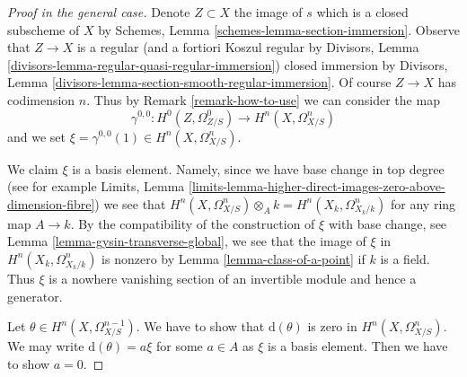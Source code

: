 \begin{proof}[Proof in the general case]
\medskip\noindent
Denote $Z \subset X$ the image of $s$ which is a closed subscheme of $X$ by
Schemes, Lemma \ref{schemes-lemma-section-immersion}.
Observe that $Z \to X$ is a regular (and a fortiori Koszul regular by
Divisors, Lemma \ref{divisors-lemma-regular-quasi-regular-immersion})
closed immersion by
Divisors, Lemma \ref{divisors-lemma-section-smooth-regular-immersion}.
Of course $Z \to X$ has codimension $n$. Thus by
Remark \ref{remark-how-to-use}
we can consider the map
$$
\gamma^{0, 0} : H^0(Z, \Omega^0_{Z/S}) \longrightarrow H^n(X, \Omega^n_{X/S})
$$
and we set $\xi = \gamma^{0, 0}(1) \in H^n(X, \Omega^n_{X/S})$.

\medskip\noindent
We claim $\xi$ is a basis element. Namely, since we have base change in
top degree (see for example Limits, Lemma
\ref{limits-lemma-higher-direct-images-zero-above-dimension-fibre})
we see that
$H^n(X, \Omega^n_{X/S}) \otimes_A k = H^n(X_k, \Omega^n_{X_k/k})$
for any ring map $A \to k$. By the compatibility of
the construction of $\xi$ with base change,
see Lemma \ref{lemma-gysin-transverse-global},
we see that the image of $\xi$ in $H^n(X_k, \Omega^n_{X_k/k})$
is nonzero by Lemma \ref{lemma-class-of-a-point} if $k$ is a field.
Thus $\xi$ is a nowhere vanishing section of an invertible module
and hence a generator.

\medskip\noindent
Let $\theta \in H^n(X, \Omega^{n - 1}_{X/S})$. We have to show that
$\text{d}(\theta)$ is zero in $H^n(X, \Omega^n_{X/S})$.
We may write $\text{d}(\theta) = a \xi$ for some $a \in A$
as $\xi$ is a basis element. Then we have to show $a = 0$.


\end{proof}
